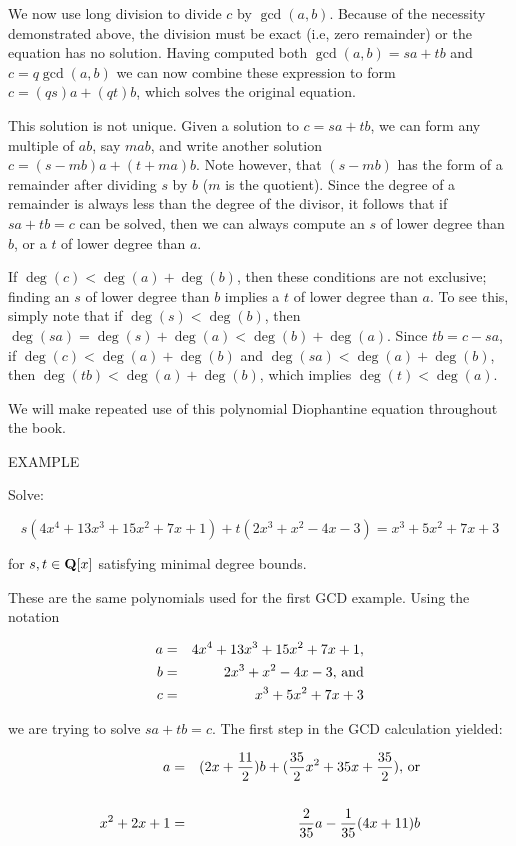 We now use long division to divide $c$ by $\gcd(a,b)$.  Because of the
necessity demonstrated above, the division must be exact (i.e, zero
remainder) or the equation has no solution.  Having computed both
$\gcd(a,b)=sa+tb$ and $c=q\gcd(a,b)$ we can now combine these
expression to form $c=(qs)a+(qt)b$, which solves the original
equation.

This solution is not unique.  Given a solution to $c=sa+tb$, we can
form any multiple of $ab$, say $mab$, and write another solution
$c=(s-mb)a+(t+ma)b$.  Note however, that $(s-mb)$ has the form of a
remainder after dividing $s$ by $b$ ($m$ is the quotient).  Since the
degree of a remainder is always less than the degree of the divisor,
it follows that if $sa+tb=c$ can be solved, then we can always compute
an $s$ of lower degree than $b$, or a $t$ of lower degree than $a$.

If $\deg(c)<\deg(a)+\deg(b)$, then these conditions are not exclusive;
finding an $s$ of lower degree than $b$ implies a $t$ of lower degree
than $a$.  To see this, simply note that if $\deg(s)<\deg(b)$, then
$\deg(sa)=\deg(s)+\deg(a)<\deg(b)+\deg(a)$.  Since $tb=c-sa$, if
$\deg(c)<\deg(a)+\deg(b)$ and $\deg(sa)<\deg(a)+\deg(b)$, then
$\deg(tb)<\deg(a)+\deg(b)$, which implies $\deg(t)<\deg(a)$.

We will make repeated use of this polynomial Diophantine equation
throughout the book.

\vfill\eject

EXAMPLE

Solve:

$$s(4x^4+13x^3+15x^2+7x+1) + t(2x^3+x^2-4x-3) = x^3 + 5x^2 + 7x +3$$

\quad for $s,t \in {\bf Q}[x]$ satisfying minimal degree bounds.

\bigskip

These are the same polynomials used for the first GCD example.
Using the notation

\begin{eqnarray*}
a &=& 4x^4+13x^3+15x^2+7x+1, \cr
b &=& 2x^3+x^2-4x-3, {\rm\,and} \cr
c &=& x^3 + 5x^2 + 7x +3 \cr
\end{eqnarray*}

we are trying to solve $sa+tb=c$.  The first step in the GCD
calculation yielded:

\begin{eqnarray*}
a &=& (2x+{11\over2})b + ({35\over2}x^2+35x+{35\over2}){\rm,\,or} \cr\cr
x^2+2x+1 &=& {2\over35}a - {1\over35}(4x+11)b \cr
\end{eqnarray*}

